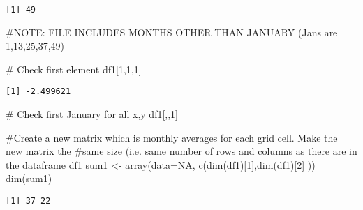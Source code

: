 \documentclass[
  letterpaper,
]{book}
\newenvironment{Shaded}{\begin{snugshade}}{\end{snugshade}}
\newcommand{\AttributeTok}[1]{\textcolor[rgb]{0.40,0.45,0.13}{#1}}
\newcommand{\CommentTok}[1]{\textcolor[rgb]{0.37,0.37,0.37}{#1}}
\newcommand{\ConstantTok}[1]{\textcolor[rgb]{0.56,0.35,0.01}{#1}}
\newcommand{\DecValTok}[1]{\textcolor[rgb]{0.68,0.00,0.00}{#1}}
\newcommand{\FunctionTok}[1]{\textcolor[rgb]{0.28,0.35,0.67}{#1}}
\newcommand{\NormalTok}[1]{\textcolor[rgb]{0.00,0.23,0.31}{#1}}
\newcommand{\OtherTok}[1]{\textcolor[rgb]{0.00,0.23,0.31}{#1}}
\begin{document}
\begin{verbatim}
[1] 49
\end{verbatim}

\begin{Shaded}
\begin{Highlighting}[]
\CommentTok{\#NOTE: FILE INCLUDES MONTHS OTHER THAN JANUARY (Jans are 1,13,25,37,49)}

\CommentTok{\# Check first element}
\NormalTok{df1[}\DecValTok{1}\NormalTok{,}\DecValTok{1}\NormalTok{,}\DecValTok{1}\NormalTok{]}
\end{Highlighting}
\end{Shaded}

\begin{verbatim}
[1] -2.499621
\end{verbatim}

\begin{Shaded}
\begin{Highlighting}[]
\CommentTok{\# Check first January for all x,y}
\NormalTok{df1[,,}\DecValTok{1}\NormalTok{]}
\end{Highlighting}
\end{Shaded}

\begin{Shaded}
\begin{Highlighting}[]
\CommentTok{\#Create a new matrix which is monthly averages for each grid cell. Make the new  matrix the }
\CommentTok{\#same size (i.e. same number of rows and columns as there are in the dataframe df1}
\NormalTok{sum1 }\OtherTok{\textless{}{-}} \FunctionTok{array}\NormalTok{(}\AttributeTok{data=}\ConstantTok{NA}\NormalTok{, }\FunctionTok{c}\NormalTok{(}\FunctionTok{dim}\NormalTok{(df1)[}\DecValTok{1}\NormalTok{],}\FunctionTok{dim}\NormalTok{(df1)[}\DecValTok{2}\NormalTok{] ))}
\FunctionTok{dim}\NormalTok{(sum1)}
\end{Highlighting}
\end{Shaded}

\begin{verbatim}
[1] 37 22
\end{verbatim}
\end{document}
